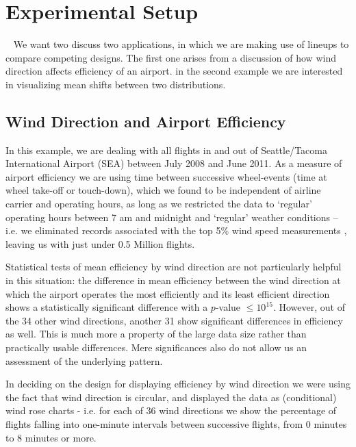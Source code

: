 \section{Experimental Setup}~\label{experimentone}
We want two discuss two applications, in which we are making use of lineups to compare competing designs. 
The first one arises from a discussion of how wind direction affects efficiency of an airport. in the second example we are interested in visualizing mean shifts between two distributions.  

\subsection{Wind Direction and Airport Efficiency}
In this example, we are dealing with all flights \cite{rita} in and out of Seattle/Tacoma International Airport (SEA) between July 2008 and June 2011. As a measure of airport efficiency we are using time between successive wheel-events (time at wheel take-off or touch-down), which we found to be independent of airline carrier and operating hours, as long as we restricted the data to `regular' operating hours between 7 am and midnight and `regular' weather conditions -- i.e. we eliminated records associated with the top 5\% wind speed measurements \cite{noaa-weather}, leaving us with just under 0.5 Million flights.

Statistical tests of mean efficiency by wind direction are not particularly helpful in this situation:
the difference in mean efficiency between the  wind direction at which the airport operates the most efficiently and its least efficient direction shows a statistically significant difference with a $p$-value $\le 10^{15}$. %
However, out of the 34 other wind directions,  another 31 show significant differences in efficiency as well. This is much more a property of the large data size rather than practically usable differences. Mere significances also do not allow us an assessment of the underlying pattern.

In deciding on the design for displaying efficiency  by wind direction we were using the fact that wind direction is circular, and  displayed the data as (conditional) wind rose charts - i.e. for each of 36 wind directions we show the percentage of flights falling into one-minute intervals between successive flights, from  0 minutes to 8 minutes or more.


